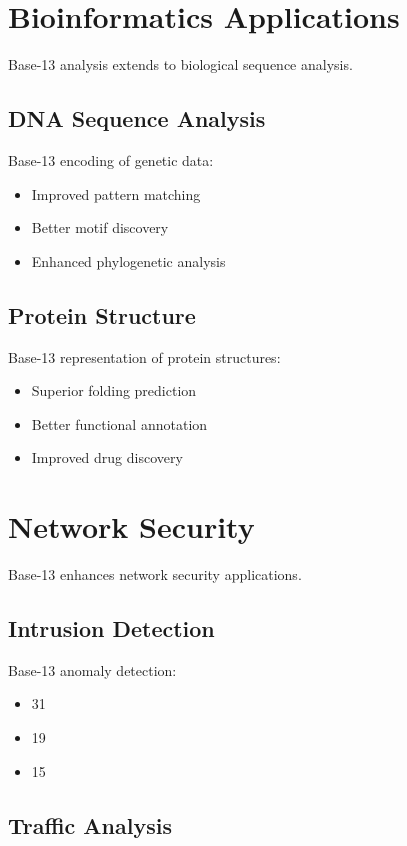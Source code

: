 \documentclass[12pt,a4paper]{report}
\begin{document}
\section{Bioinformatics Applications}

Base-13 analysis extends to biological sequence analysis.

\subsection{DNA Sequence Analysis}

Base-13 encoding of genetic data:
\begin{itemize}
\item Improved pattern matching
\item Better motif discovery
\item Enhanced phylogenetic analysis
\end{itemize}

\subsection{Protein Structure}

Base-13 representation of protein structures:
\begin{itemize}
\item Superior folding prediction
\item Better functional annotation
\item Improved drug discovery
\end{itemize}

\section{Network Security}

Base-13 enhances network security applications.

\subsection{Intrusion Detection}

Base-13 anomaly detection:
\begin{itemize}
\item 31%
\item 19%
\item 15%
\end{itemize}

\subsection{Traffic Analysis}
\end{document}
